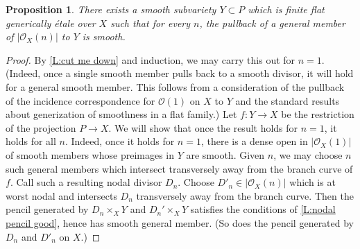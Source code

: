 \documentclass[11pt]{amsart}
\newcommand{\ms}[1]{\mathscr #1}
\renewcommand{\[}{[\!\hspace{0.03em}[}
\renewcommand{\]}{]\!\hspace{0.03em}]}
\renewcommand{\(}{(\!\hspace{0.03em}(}
\renewcommand{\)}{)\!\hspace{0.03em})}
\newtheorem{prop}[lem]{Proposition}
\theoremstyle{definition}
\theoremstyle{remark}
\begin{document}
\begin{prop}\label{P:finite happy cover} There exists a smooth 
subvariety $Y\subset P$ which is finite flat generically \'etale
over $X$ such that for every $n$, the pullback of a general member 
of $|{\ms O}_{X}(n)|$ to $Y$ is smooth.
\end{prop}
\begin{proof} By \ref{L:cut me down} and induction, we may carry this out 
for $n=1$.  (Indeed, once a single smooth member pulls back to a 
smooth divisor, it will hold for a general smooth member.  This 
follows from a consideration of the pullback of the incidence 
correspondence for ${\ms O}(1)$ on $X$ to $Y$ and the standard results 
about generization of smoothness in a flat family.)
Let $f:Y\to X$ be the restriction of the projection $P\to X$.  We 
will show that once the result holds for $n=1$, it holds for all $n$.  
Indeed, once it holds for $n=1$, there is a dense open in 
$|{\ms O}_{X}(1)|$ of smooth members whose preimages in $Y$ are smooth.  Given 
$n$, we may choose 
$n$ such general members which intersect transversely away from the 
branch curve of $f$.  Call such a resulting nodal divisor $D_{n}$.  Choose 
$D'_{n}\in|{\ms O}_{X}(n)|$ which is at worst nodal and intersects $D_{n}$ 
transversely away from the branch curve.  Then the pencil generated 
by $D_{n}\times_{X}Y$ and $D_{n}'\times_{X}Y$ satisfies the conditions 
of \ref{L:nodal pencil good}, hence has smooth general member.  (So 
does the pencil generated by $D_{n}$ and $D'_{n}$ on $X$.)
\end{proof}
\end{document}
